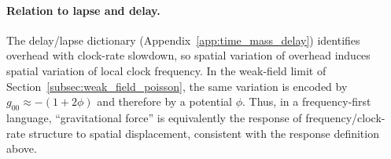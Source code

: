 \paragraph{Relation to lapse and delay.}
\InterfaceTag The delay/lapse dictionary (Appendix~\ref{app:time_mass_delay}) identifies overhead with clock-rate slowdown,
so spatial variation of overhead induces spatial variation of local clock frequency.
In the weak-field limit of Section~\ref{subsec:weak_field_poisson}, the same variation is encoded by $g_{00}\approx -(1+2\phi)$ and therefore by a potential $\phi$.
Thus, in a frequency-first language, ``gravitational force'' is equivalently the response of frequency/clock-rate structure to spatial displacement, consistent with the response definition above.


